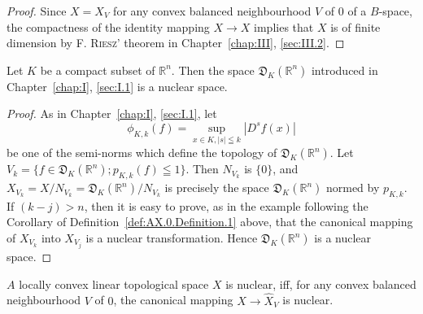 \begin{proof}
 Since $X = X_{V}$ for any convex balanced neighbourhood $V$ of $0$ of a $B$-space, the compactness of the identity mapping $X \to X$ implies that $X$ is of finite dimension by F. \textsc{Riesz}' theorem in Chapter~\ref{chap:III}, \ref{sec:III.2}. 
\end{proof}

\begin{example}\label{ex:AX.0.Example.3} Let $K$ be a compact subset of $\mathbb{R}^{n}$. Then the space $\mathfrak{D}_K(\mathbb{R}^{n})$ introduced in Chapter~\ref{chap:I}, \ref{sec:I.1} is a nuclear space. 
\end{example}

\begin{proof}
 As in Chapter~\ref{chap:I}, \ref{sec:I.1}, let 
\[
\phi_{K,k} (f) = \sup\limits _{x \in K, | s | \leqq k} | D ^{s} f (x) |
\]
be one of the semi-norms which define the topology of $\mathfrak{D}_K(\mathbb{R}^{n})$. Let $V_k = \{f \in \mathfrak{D}_K(\mathbb{R}^{n}); p_{K,k}(f) \leqq 1\}$. Then $N_{V_{k}}$ is $\{0\}$, and $X_{V_{k}} = X / N_{V_{k}} = \mathfrak{D}_K(\mathbb{R}^{n}) / N_{V_{k}}$ is precisely the space $\mathfrak{D}_K(\mathbb{R}^{n})$ normed by $p_{K,k}$. If $(k-j) > n$, then it is easy to prove, as in the example following the Corollary of Definition~\ref{def:AX.0.Definition.1} above, that the canonical mapping of $X_{V_{k}}$ into $X_{V_{j}}$ is a nuclear transformation. Hence $\mathfrak{D}_K(\mathbb{R}^{n})$ is a nuclear space. 
\end{proof}

\begin{theorem}\label{thm:AX.0.Theorem.1} $A$ locally convex linear topological space $X$ is nuclear, iff, for any convex balanced neighbourhood $V$ of $0$, the canonical mapping $X \rightarrow \hat{X}_{V}$ is nuclear. 
\end{theorem}


